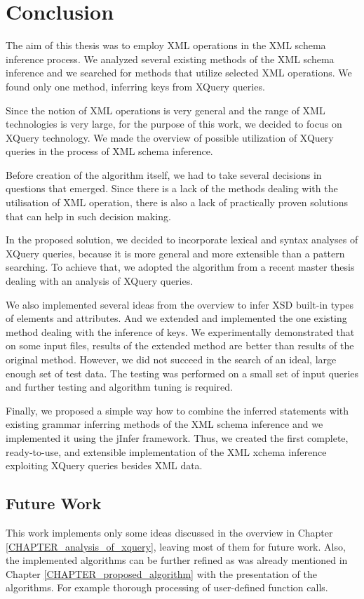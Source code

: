 \chapter{Conclusion}
The aim of this thesis was to employ XML operations in the XML schema inference process. We analyzed several existing methods of the XML schema inference and we searched for methods that utilize selected XML operations. We found only one method, inferring keys from XQuery queries.

Since the notion of XML operations is very general and the range of XML technologies is very large, for the purpose of this work, we decided to focus on XQuery technology. We made the overview of possible utilization of XQuery queries in the process of XML schema inference.

Before creation of the algorithm itself, we had to take several decisions in questions that emerged. Since there is a lack of the methods dealing with the utilisation of XML operation, there is also a lack of practically proven solutions that can help in such decision making.

In the proposed solution, we decided to incorporate lexical and syntax analyses of XQuery queries, because it is more general and more extensible than a pattern searching. To achieve that, we adopted the algorithm from a recent master thesis dealing with an analysis of XQuery queries.

We also implemented several ideas from the overview to infer XSD built-in types of elements and attributes. And we extended and implemented the one existing method dealing with the inference of keys. We experimentally demonstrated that on some input files, results of the extended method are better than results of the original method. However, we did not succeed in the search of an ideal, large enough set of test data. The testing was performed on a small set of input queries and further testing and algorithm tuning is required.

Finally, we proposed a simple way how to combine the inferred statements with existing grammar inferring methods of the XML schema inference and we implemented it using the jInfer framework. Thus, we created the first complete, ready-to-use, and extensible implementation of the XML xchema inference exploiting XQuery queries besides XML data.


\section{Future Work}
This work implements only some ideas discussed in the overview in Chapter \ref{CHAPTER_analysis_of_xquery}, leaving most of them for future work. Also, the implemented algorithms can be further refined as was already mentioned in Chapter \ref{CHAPTER_proposed_algorithm} with the presentation of the algorithms. For example thorough processing of user-defined function calls.


